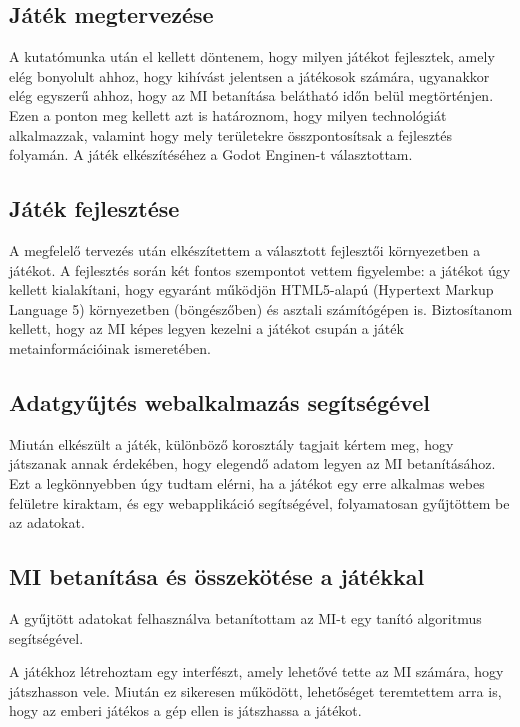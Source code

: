 \subsection{Játék megtervezése}
A kutatómunka után el kellett döntenem, hogy milyen játékot fejlesztek, amely elég bonyolult ahhoz, hogy kihívást jelentsen a játékosok számára, ugyanakkor elég egyszerű ahhoz, hogy az MI betanítása belátható időn belül megtörténjen. Ezen a ponton meg kellett azt is határoznom, hogy milyen technológiát alkalmazzak, valamint hogy mely területekre összpontosítsak a fejlesztés folyamán.
A játék elkészítéséhez a Godot Enginen-t választottam.

\subsection{Játék fejlesztése}
A megfelelő tervezés után elkészítettem a választott fejlesztői környezetben a játékot.
A fejlesztés során két fontos szempontot vettem figyelembe:
a játékot úgy kellett kialakítani, hogy egyaránt működjön HTML5-alapú (Hypertext Markup Language 5) környezetben (böngészőben) és asztali számítógépen is.
Biztosítanom kellett, hogy az MI képes legyen kezelni a játékot csupán a játék metainformációinak ismeretében.

\subsection{Adatgyűjtés webalkalmazás segítségével}
Miután elkészült a játék, különböző korosztály tagjait kértem meg, hogy játszanak annak érdekében, hogy elegendő adatom legyen az MI betanításához. 
Ezt a legkönnyebben úgy tudtam elérni, ha a játékot egy erre alkalmas webes felületre kiraktam, és egy webapplikáció segítségével, folyamatosan gyűjtöttem be az adatokat. 

\subsection{MI betanítása és összekötése a játékkal}
A gyűjtött adatokat felhasználva betanítottam az MI-t egy tanító algoritmus segítségével.

A játékhoz létrehoztam egy interfészt, amely lehetővé tette az MI számára, hogy játszhasson vele. Miután ez sikeresen működött, lehetőséget teremtettem arra is, hogy az emberi játékos a gép ellen is játszhassa a játékot.
